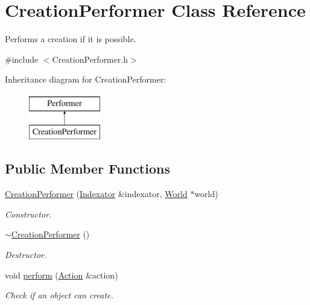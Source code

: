 \hypertarget{classCreationPerformer}{\section{Creation\-Performer Class Reference}
\label{classCreationPerformer}
}


Performs a creation if it is possible.  




{\ttfamily \#include $<$Creation\-Performer.\-h$>$}

Inheritance diagram for Creation\-Performer\-:\begin{figure}[H]
\begin{center}
\leavevmode
\includegraphics[height=2.000000cm]{classCreationPerformer}
\end{center}
\end{figure}
\subsection*{Public Member Functions}
\begin{DoxyCompactItemize}
\item 
\hyperlink{classCreationPerformer_a063913f6c9b6655b1fa936b1c4b418f0}{Creation\-Performer} (\hyperlink{classIndexator}{Indexator} \&indexator, \hyperlink{classWorld}{World} $\ast$world)
\begin{DoxyCompactList}\small\item\em Constructor. \end{DoxyCompactList}\item 
\hyperlink{classCreationPerformer_a7b117d6c88ab14ec084e580faf245df1}{$\sim$\-Creation\-Performer} ()
\begin{DoxyCompactList}\small\item\em Destructor. \end{DoxyCompactList}\item 
void \hyperlink{classCreationPerformer_a910e6f4c9e88fde870a4ca35e01c0173}{perform} (\hyperlink{classAction}{Action} \&action)
\begin{DoxyCompactList}\small\item\em Check if an object can create. \end{DoxyCompactList}\end{DoxyCompactItemize}


